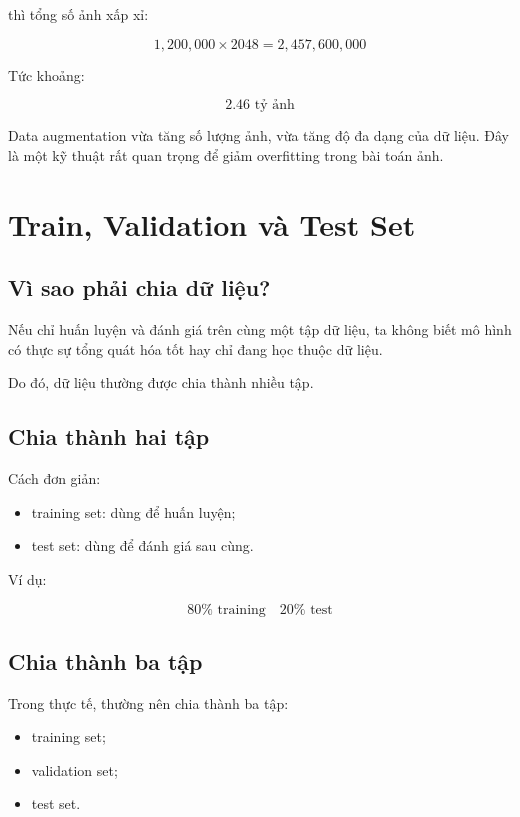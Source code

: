thì tổng số ảnh xấp xỉ:

\[
    1,200,000 \times 2048
    =
    2,457,600,000
\]

Tức khoảng:

\[
    2.46 \text{ tỷ ảnh}
\]

\begin{ghinho}
Data augmentation vừa tăng số lượng ảnh, vừa tăng độ đa dạng của dữ liệu. Đây là một kỹ thuật rất quan trọng để giảm overfitting trong bài toán ảnh.
\end{ghinho}

\section{Train, Validation và Test Set}

\subsection{Vì sao phải chia dữ liệu?}

Nếu chỉ huấn luyện và đánh giá trên cùng một tập dữ liệu, ta không biết mô hình có thực sự tổng quát hóa tốt hay chỉ đang học thuộc dữ liệu.

Do đó, dữ liệu thường được chia thành nhiều tập.

\subsection{Chia thành hai tập}

Cách đơn giản:

\begin{itemize}
    \item training set: dùng để huấn luyện;
    \item test set: dùng để đánh giá sau cùng.
\end{itemize}

Ví dụ:

\[
    80\% \text{ training}
    \quad
    20\% \text{ test}
\]

\subsection{Chia thành ba tập}

Trong thực tế, thường nên chia thành ba tập:

\begin{itemize}
    \item training set;
    \item validation set;
    \item test set.
\end{itemize}

